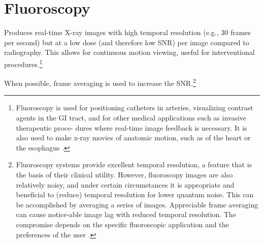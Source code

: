 \chapter{Fluoroscopy}

Produces real-time X-ray images with high temporal resolution (e.g.,
30 frames per second) but at a low dose (and therefore low \gls{SNR})
per image compared to radiography. This allows for continuous motion
viewing, useful for interventional procedures.\footnote{Fluoroscopy is
  used for positioning catheters in arteries, visualizing contrast
  agents in the \gls{GI} tract, and for other medical applications
  such as invasive therapeutic proce- dures where real-time image
  feedback is necessary. It is also used to make x-ray movies of
  anatomic motion, such as of the heart or the esophagus
  \cite{bushberg2011essential}.}

When possible, frame averaging is used to increase the
SNR.\footnote{Fluoroscopy systems provide excellent temporal
  resolution, a feature that is the basis of their clinical
  utility. However, fluoroscopy images are also relatively noisy, and
  under certain circumstances it is appropriate and beneficial to
  (reduce) temporal resolution for lower quantum noise. This can be
  accomplished by averaging a series of images. Appreciable frame
  averaging can cause notice-able image lag with reduced temporal
  resolution. The compromise depends on the specific fluoroscopic
  application and the preferences of the user
  \cite{bushberg2011essential}.}
